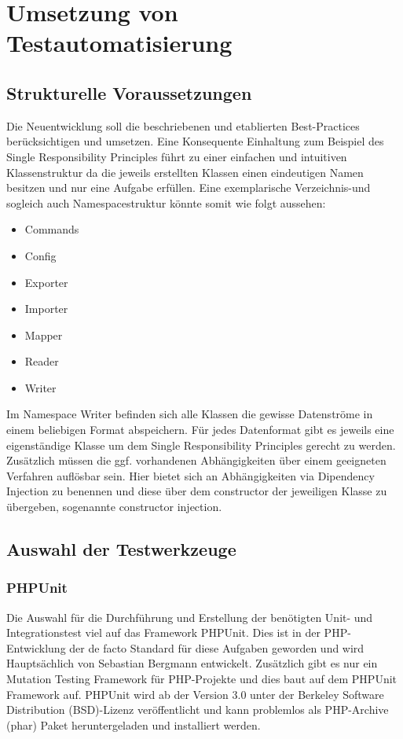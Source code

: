 \newpage
\section{Umsetzung von Testautomatisierung}\label{umsetzung}

\subsection{Strukturelle Voraussetzungen}
Die Neuentwicklung soll die beschriebenen und etablierten Best-Practices berücksichtigen und umsetzen. Eine Konsequente Einhaltung zum Beispiel des Single Responsibility Principles führt zu einer einfachen und intuitiven Klassenstruktur da die jeweils erstellten Klassen einen eindeutigen Namen besitzen und nur eine Aufgabe erfüllen. Eine exemplarische Verzeichnis-und sogleich auch Namespacestruktur könnte somit wie folgt aussehen: 

\begin{itemize}
	\item Commands
	\item Config
	\item Exporter
	\item Importer
	\item Mapper
	\item Reader
	\item Writer
\end{itemize}

Im Namespace Writer befinden sich alle Klassen die gewisse Datenströme in einem beliebigen Format abspeichern. Für jedes Datenformat gibt es jeweils eine eigenständige Klasse um dem Single Responsibility Principles gerecht zu werden. Zusätzlich müssen die ggf. vorhandenen Abhängigkeiten über einem geeigneten Verfahren auflösbar sein. Hier bietet sich an Abhängigkeiten via Dipendency Injection zu benennen und diese über dem constructor der jeweiligen Klasse zu übergeben, sogenannte constructor injection.

\subsection{Auswahl der Testwerkzeuge}
\subsubsection{PHPUnit}
Die Auswahl für die Durchführung und Erstellung der benötigten Unit- und Integrationstest viel auf das Framework PHPUnit. Dies ist in der PHP-Entwicklung der de facto Standard für diese Aufgaben geworden und wird Hauptsächlich von Sebastian Bergmann entwickelt. Zusätzlich gibt es nur ein Mutation Testing Framework für PHP-Projekte und dies baut auf dem PHPUnit Framework auf. PHPUnit wird ab der Version 3.0 unter der Berkeley Software Distribution (BSD)-Lizenz veröffentlicht und kann problemlos als PHP-Archive (phar) Paket heruntergeladen und installiert werden.

